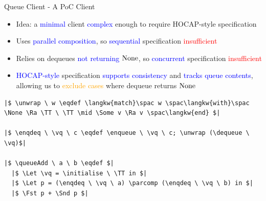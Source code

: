 \documentclass[9pt,xcolor={dvipsnames}]{beamer}
\newcommand{\initialise}{\operatorname{initialize}}
\newcommand{\enqueue}{\operatorname{enqueue}}
\newcommand{\dequeue}{\operatorname{dequeue}}
\newcommand{\unwrap}{\operatorname{unwrap}}
\newcommand{\enqdeq}{\operatorname{enqdeq}}
\newcommand{\queueAdd}{\operatorname{queueAdd}}
\newcommand{\parcomp}{\ensuremath{\mathbin{||}}}
\newcommand{\vq}{v_q}
\begin{document}
\begin{frame}[fragile]{Queue Client - A PoC Client}
  \begin{itemize}
    \item Idea: a \textcolor{blue}{minimal} client \textcolor{blue}{complex} enough to require HOCAP-style specification
    \item Uses \textcolor{blue}{parallel composition}, so \textcolor{blue}{sequential} specification \textcolor{red}{insufficient}
    \item Relies on dequeues \textcolor{blue}{not returning $\operatorname{None}$}, so \textcolor{blue}{concurrent} specification \textcolor{red}{insufficient}
    \item \textcolor{blue}{HOCAP-style} specification \textcolor{blue}{supports consistency} and \textcolor{blue}{tracks queue contents}, allowing us to \textcolor{orange}{exclude cases} where dequeue returns $\operatorname{None}$
  \end{itemize}
  \begin{verbatim}
|$ \unwrap \ w \eqdef \langkw{match}\spac w \spac\langkw{with}\spac \None \Ra \TT \ \TT \mid \Some v \Ra v \spac\langkw{end} $|

|$ \enqdeq \ \vq \ c \eqdef \enqueue \ \vq \ c; \unwrap (\dequeue \ \vq)$|

|$ \queueAdd \ a \ b \eqdef $|
  |$ \Let \vq = \initialise \ \TT in $|
  |$ \Let p = (\enqdeq \ \vq \ a) \parcomp (\enqdeq \ \vq \ b) in $|
  |$ \Fst p + \Snd p $|
  \end{verbatim}
\end{frame}
\end{document}
